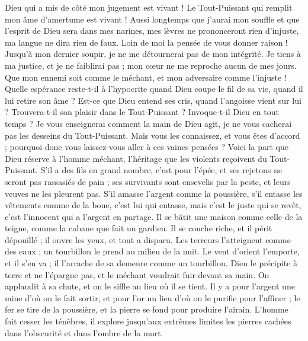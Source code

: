 \begin{multicols}{2}
Dieu qui a mis de côté mon jugement est vivant ! Le Tout-Puissant qui remplit mon âme d'amertume est vivant !
Aussi longtemps que j'aurai mon souffle et que l'esprit de Dieu sera dans mes narines,
mes lèvres ne prononceront rien d'injuste, ma langue ne dira rien de faux.
Loin de moi la pensée de vous donner raison ! Jusqu'à mon dernier soupir, je ne me détournerai pas de mon intégrité.
Je tiens à ma justice, et je ne faiblirai pas ; mon cœur ne me reproche aucun de mes jours.
Que mon ennemi soit comme le méchant, et mon adversaire comme l'injuste !
Quelle espérance reste-t-il à l'hypocrite quand Dieu coupe le fil de sa vie, quand il lui retire son âme ?
Est-ce que Dieu entend ses cris, quand l'angoisse vient sur lui ?
Trouvera-t-il son plaisir dans le Tout-Puissant ? Invoque-t-il Dieu en tout temps ?
Je vous enseignerai comment la main de Dieu agit, je ne vous cacherai pas les desseins du Tout-Puissant.
Mais vous les connaissez, et vous êtes d'accord ; pourquoi donc vous laissez-vous aller à ces vaines pensées ?
Voici la part que Dieu réserve à l'homme méchant, l'héritage que les violents reçoivent du Tout-Puissant.
S'il a des fils en grand nombre, c'est pour l'épée, et ses rejetons ne seront pas rassasiés de pain ;
ses survivants sont ensevelis par la peste, et leurs veuves ne les pleurent pas.
S'il amasse l'argent comme la poussière, s'il entasse les vêtements comme de la boue,
c'est lui qui entasse, mais c'est le juste qui se revêt, c'est l'innocent qui a l'argent en partage.
Il se bâtit une maison comme celle de la teigne, comme la cabane que fait un gardien.
Il se couche riche, et il périt dépouillé ; il ouvre les yeux, et tout a disparu.
Les terreurs l'atteignent comme des eaux ; un tourbillon le prend au milieu de la nuit.
Le vent d'orient l'emporte, et il s'en va ; il l'arrache de sa demeure comme un tourbillon.
Dieu le précipite à terre et ne l'épargne pas, et le méchant voudrait fuir devant sa main.
On applaudit à sa chute, et on le siffle au lieu où il se tient.
\VerseOne{}Il y a pour l'argent une mine d'où on le fait sortir, et pour l'or un lieu d'où on le purifie pour l'affiner ;
le fer se tire de la poussière, et la pierre se fond pour produire l'airain.
L'homme fait cesser les ténèbres, il explore jusqu'aux extrêmes limites les pierres cachées dans l'obscurité et dans l'ombre de la mort.

\end{multicols}
